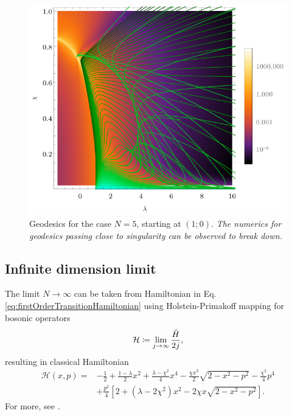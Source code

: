 \begin{figure}[H]
    \centering
    \includegraphics[scale=1.3]{../img/N=5_geods00.pdf}
    \caption{Geodesics for the case $N=5$, starting at $(1;0)$. \emph{The numerics for geodesics passing close to singularity can be observed to break down.}}
    \label{fig:geod10}    
\end{figure}







\subsection{Infinite dimension limit}
\label{chap:infiniteDimensionLimit}
The limit $N\rightarrow \infty$ can be taken from Hamiltonian in Eq. \ref{eq:firstOrderTransitionHamiltonian} using Holstein-Primakoff mapping \citep{holstein} for bosonic operators
\begin{equation}
    \mathcal{H}\coloneqq\lim_{j\rightarrow\infty}\frac{\hat{H}}{2j},
\end{equation}
resulting in classical Hamiltonian
\begin{equation}
    \begin{split}
        \mathcal{H}(x,p)=&-\frac{1}{2}+\frac{1-\lambda}{2}x^2+\frac{\lambda-\chi^2}{4}x^4-\frac{\chi x^3}{2}\sqrt{2-x^2-p^2}-\frac{\chi^2}{4}p^4\\
        &+\frac{p^2}{4}\left[2+(\lambda-2\chi^2)x^2-2\chi x\sqrt{2-x^2-p^2}\right].
    \end{split}
    \label{eq:HamiltonianClassicalLimit}
\end{equation}
For more, see \citet{felipe}.

